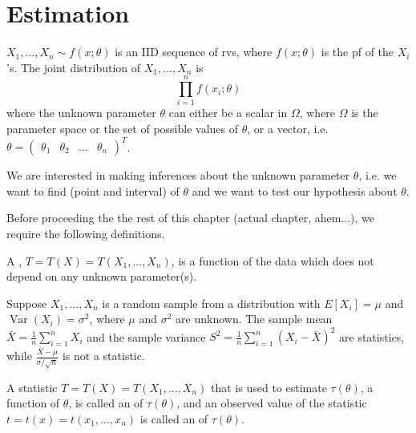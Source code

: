 \documentclass[notoc,notitlepage]{tufte-book}
\DeclareMathOperator{\Var}{Var }
\begin{document}
\section{Estimation}%
\label{sec:estimation}

 $X_1, ..., X_n \sim f(x; \theta)$ is an IID sequence of rvs, where $f(x; \theta)$ is the pf of the $X_i$'s. The joint distribution of $X_1, ..., X_n$ is
\begin{equation*}
  \prod_{i=1}^{n} f(x_i; \theta)
\end{equation*}
where the unknown parameter $\theta$ can either be a scalar in $\Omega$, where $\Omega$ is the parameter space or the set of possible values of $\theta$, or a vector, i.e. $\theta = \begin{pmatrix} \theta_1 & \theta_2 & \hdots & \theta_n \end{pmatrix}^T$.

We are interested in making inferences about the unknown parameter $\theta$, i.e. we want to find  (point and interval) of $\theta$ and we want to test our hypothesis about $\theta$.

Before proceeding the the rest of this chapter (actual chapter, ahem...), we require the following definitions.

\begin{defn}[Statistic]
\label{defn:statistic}
  A , $T = T(X) = T(X_1, ..., X_n)$, is a function of the data which does not depend on any unknown parameter(s).
\end{defn}

\begin{eg}
  Suppose $X_1, ..., X_n$ is a random sample from a distribution with $E[X_i] = \mu$ and $\Var(X_i) = \sigma^2$, where $\mu$ and $\sigma^2$ are unknown. The sample mean $\bar{X} = \frac{1}{n} \sum_{i=1}^{n} X_i$ and the sample variance $S^2 = \frac{1}{n} \sum_{i=1}^{n} (X_i - \bar{X})^2$ are statistics, while $\frac{\bar{X} - \mu}{\sigma / \sqrt{n}}$ is not a statistic.
\end{eg}

\begin{defn}
\label{defn:estimator}
A statistic $T = T(X) = T(X_1, ..., X_n)$ that is used to estimate $\tau(\theta)$, a function of $\theta$, is called an  of $\tau(\theta)$, and an observed value of the statistic $t = t(x) = t(x_1, ..., x_n)$ is called an  of $\tau(\theta)$.
\end{defn}
\end{document}
